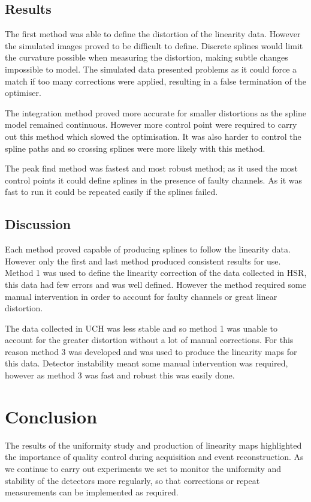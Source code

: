 \subsection{Results}
The first method was able to define the distortion of the linearity data. However the simulated images proved to be difficult to define. Discrete splines would limit the curvature possible when measuring the distortion, making subtle changes impossible to model. The simulated data presented problems as it could force a match if too many corrections were applied, resulting in a false termination of the optimiser.

The integration method proved more accurate for smaller distortions as the spline model remained continuous. However more control point were required to carry out this method which slowed the optimisation. It was also harder to control the spline paths and so crossing splines were more likely with this method. 

The peak find method was fastest and most robust method; as it used the most control points it could define splines in the presence of faulty channels. As it was fast to run it could be repeated easily if the splines failed. 
\subsection{Discussion}
Each method proved capable of producing splines to follow the linearity data. However only the first and last method produced consistent results for use. Method 1 was used to define the linearity correction of the data collected in \acrshort{HSR}, this data had few errors and was well defined. However the method required some manual intervention in order to account for faulty channels or great linear distortion. 

The data collected in \acrshort{UCH} was less stable and so method 1 was unable to account for the greater distortion without a lot of manual corrections. For this reason method 3 was developed and was used to produce the linearity maps for this data. Detector instability meant some manual intervention was required, however as method 3 was fast and robust this was easily done. 
\section{Conclusion}
The results of the uniformity study and production of linearity maps highlighted the importance of quality control during acquisition and event reconstruction. As we continue to carry out experiments we set to monitor the uniformity and stability of the detectors more regularly, so that corrections or repeat measurements can be implemented as required.

